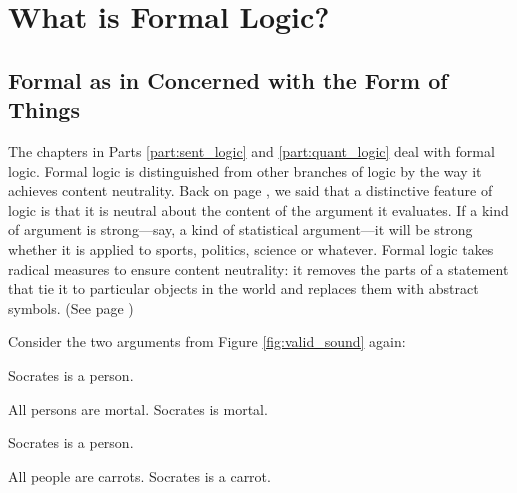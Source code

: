 \chapter{What is Formal Logic?}
\label{chap:whatisformallogic}
\setlength{\parindent}{1em}


\section{Formal as in Concerned with the Form of Things}


The chapters in 
{Parts  %
{\ref{part:sent_logic} and \ref{part:quant_logic}}} %
deal with formal logic. Formal logic is distinguished from other branches of logic by the way it achieves content neutrality. Back on page \pageref{def:content_neutrality}, we said that a distinctive feature of logic is that it is neutral about the content of the argument it evaluates. If a kind of argument is strong---say, a kind of statistical argument---it will be strong whether it is applied to sports, politics, science or whatever. Formal logic takes radical measures to ensure content neutrality: it removes the parts of a statement that tie it to particular objects in the world and replaces them with abstract symbols. (See page \pageref{def:Formal_logic})

Consider the two arguments from Figure \ref{fig:valid_sound} again:
\begin{multicols}{2}
\begin{earg*}
\item Socrates is a person.
\item All persons are mortal.
\itemc Socrates is mortal.
\end{earg*}

\begin{earg*}
\item Socrates is a person.
\item All people are carrots.
\itemc Socrates is a carrot.
\end{earg*}

\end{multicols}

